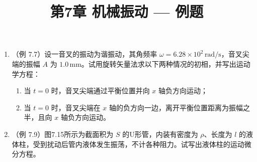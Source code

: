 \documentclass{ctexart}
\title{\textbf{第7章 机械振动} --- 例题}
\author{}
\date{}
\begin{document}
\maketitle

\begin{enumerate}

\item（例 7.7）设一音叉的振动为谐振动，其角频率 $\omega = 6.28 \times 10^{2}\,\text{rad/s}$，音叉尖端的振幅 $A$ 为 $1.0\,\text{mm}$。试用旋转矢量法求以下两种情况的初相，并写出运动学方程：
\begin{enumerate}
  \item 当 $t = 0$ 时，音叉尖端通过平衡位置并向 $x$ 轴负方向运动；
  \item 当 $t = 0$ 时，音叉尖端在 $x$ 轴的负方向一边，离开平衡位置距离为振幅之半，且向 $x$ 轴负方向运动。
\end{enumerate}

\item（例 7.9）图7.15所示为截面积为 $S$ 的U形管，内装有密度为 $\rho$、长度为 $l$ 的液体柱，受到扰动后管内液体发生振荡，不计各种阻力。试写出液体柱的运动微分方程。

\end{enumerate}
\end{document}
